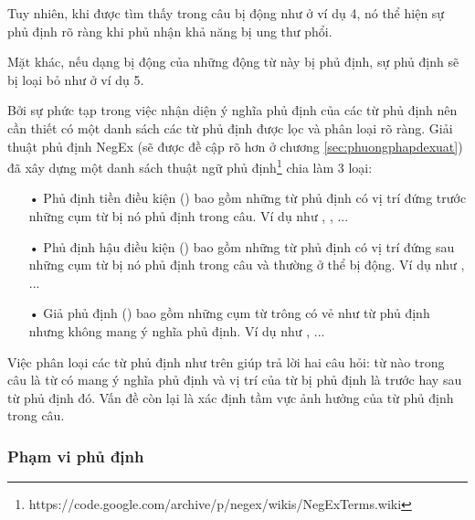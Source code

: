 
Tuy nhiên, khi được tìm thấy trong câu bị động như ở ví dụ 4, nó thể hiện sự phủ định rõ ràng khi phủ nhận khả năng bị ung thư phổi. 


Mặt khác, nếu dạng bị động của những động từ này bị phủ định, sự phủ định sẽ bị loại bỏ như ở ví dụ 5.


Bởi sự phức tạp trong việc nhận diện ý nghĩa phủ định của các từ phủ định nên cần thiết có một danh sách các từ phủ định được lọc và phân loại rõ ràng. Giải thuật phủ định NegEx (sẽ được đề cập rõ hơn ở chương \ref{sec:phuongphapdexuat}) đã xây dựng một danh sách thuật ngữ phủ định\footnote{https://code.google.com/archive/p/negex/wikis/NegExTerms.wiki} chia làm 3 loại:

\begin{itemize}
\item[•] Phủ định tiền điều kiện () bao gồm những từ phủ định có vị trí đứng trước những cụm từ bị nó phủ định trong câu. Ví dụ như , , ...
\item[•] Phủ định hậu điều kiện () bao gồm những từ phủ định có vị trí đứng sau những cụm từ bị nó phủ định trong câu và thường ở thể bị động. Ví dụ như , ...
\item[•] Giả phủ định () bao gồm những cụm từ trông có vẻ như từ phủ định nhưng không mang ý nghĩa phủ định. Ví dụ như , ...
\end{itemize}

Việc phân loại các từ phủ định như trên giúp trả lời hai câu hỏi: từ nào trong câu là từ có mang ý nghĩa phủ định và vị trí của từ bị phủ định là trước hay sau từ phủ định đó. Vấn đề còn lại là xác định tầm vực ảnh hưởng của từ phủ định trong câu.

\subsubsection*{Phạm vi phủ định}

